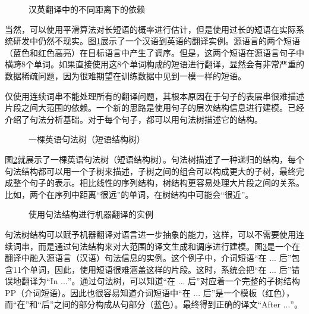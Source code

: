 \begin{figure}[htp]
\centering

\caption{汉英翻译中的不同距离下的依赖}
\label{fig:8-1}
\end{figure}

\parinterval 当然，可以使用平滑算法对长短语的概率进行估计，但是使用过长的短语在实际系统研发中仍然不现实。图\ref{fig:8-1}展示了一个汉语到英语的翻译实例。源语言的两个短语（蓝色和红色高亮）在目标语言中产生了调序。但是，这两个短语在源语言句子中横跨8个单词。如果直接使用这8个单词构成的短语进行翻译，显然会有非常严重的数据稀疏问题，因为很难期望在训练数据中见到一模一样的短语。

\parinterval 仅使用连续词串不能处理所有的翻译问题，其根本原因在于句子的表层串很难描述片段之间大范围的依赖。一个新的思路是使用句子的层次结构信息进行建模。{\chapterthree}已经介绍了句法分析基础。对于每个句子，都可以用句法树描述它的结构。

\begin{figure}[htp]
\centering

\caption{一棵英语句法树（短语结构树）}
\label{fig:8-2}
\end{figure}

\parinterval 图\ref{fig:8-2}就展示了一棵英语句法树（短语结构树）。句法树描述了一种递归的结构，每个句法结构都可以用一个子树来描述，子树之间的组合可以构成更大的子树，最终完成整个句子的表示。相比线性的序列结构，树结构更容易处理大片段之间的关系。比如，两个在序列中距离“很远”的单词，在树结构中可能会“很近”。

\begin{figure}[htp]
\centering

\caption{使用句法结构进行机器翻译的实例}
\label{fig:8-3}
\end{figure}

\parinterval 句法树结构可以赋予机器翻译对语言进一步抽象的能力，这样，可以不需要使用连续词串，而是通过句法结构来对大范围的译文生成和调序进行建模。图\ref{fig:8-3}是一个在翻译中融入源语言（汉语）句法信息的实例。这个例子中，介词短语“在 $...$ 后”包含11个单词，因此，使用短语很难涵盖这样的片段。这时，系统会把“在 $...$ 后”错误地翻译为“In $...$”。通过句法树，可以知道“在 $...$ 后”对应着一个完整的子树结构PP（介词短语）。因此也很容易知道介词短语中“在 $...$ 后”是一个模板（红色），而“在”和“后”之间的部分构成从句部分（蓝色）。最终得到正确的译文“After $...$”。


